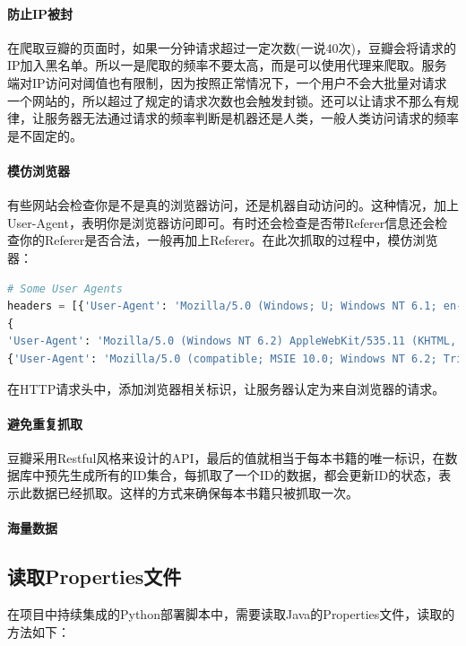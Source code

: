 \documentclass[letter]{book}
\begin{document}
\paragraph{防止IP被封}在爬取豆瓣的页面时，如果一分钟请求超过一定次数(一说40次)，豆瓣会将请求的IP加入黑名单。所以一是爬取的频率不要太高，而是可以使用代理来爬取。服务端对IP访问对阈值也有限制，因为按照正常情况下，一个用户不会大批量对请求一个网站的，所以超过了规定的请求次数也会触发封锁。还可以让请求不那么有规律，让服务器无法通过请求的频率判断是机器还是人类，一般人类访问请求的频率是不固定的。

\paragraph{模仿浏览器}有些网站会检查你是不是真的浏览器访问，还是机器自动访问的。这种情况，加上User-Agent，表明你是浏览器访问即可。有时还会检查是否带Referer信息还会检查你的Referer是否合法，一般再加上Referer。在此次抓取的过程中，模仿浏览器：

\begin{lstlisting}[language=Python]
# Some User Agents
headers = [{'User-Agent': 'Mozilla/5.0 (Windows; U; Windows NT 6.1; en-US; rv:1.9.1.6) Gecko/20091201 Firefox/3.5.6'}, \
{
'User-Agent': 'Mozilla/5.0 (Windows NT 6.2) AppleWebKit/535.11 (KHTML, like Gecko) Chrome/17.0.963.12 Safari/535.11'}, \
{'User-Agent': 'Mozilla/5.0 (compatible; MSIE 10.0; Windows NT 6.2; Trident/6.0)'}]
\end{lstlisting}

在HTTP请求头中，添加浏览器相关标识，让服务器认定为来自浏览器的请求。

\paragraph{避免重复抓取}豆瓣采用Restful风格来设计的API，最后的值就相当于每本书籍的唯一标识，在数据库中预先生成所有的ID集合，每抓取了一个ID的数据，都会更新ID的状态，表示此数据已经抓取。这样的方式来确保每本书籍只被抓取一次。

\paragraph{海量数据}

\subsection{读取Properties文件}

在项目中持续集成的Python部署脚本中，需要读取Java的Properties文件，读取的方法如下：
\end{document}
